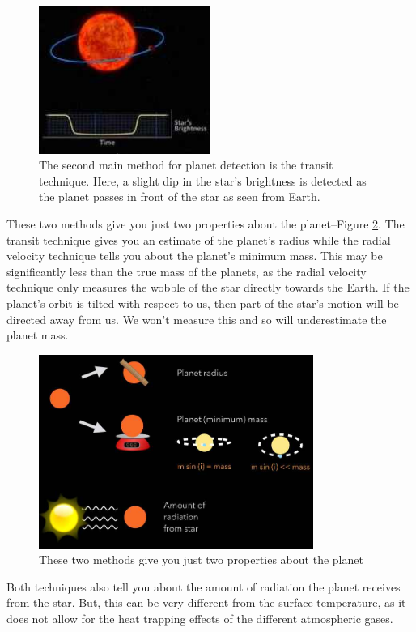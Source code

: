 \documentclass[]{article}
\begin{document}
\begin{figure}[H]
	\begin{center}
		\caption[The transit technique]{The second main method for planet detection is the transit technique. Here, a slight dip in the star's brightness is detected as the planet passes in front of the star as seen from Earth.}\label{fig:transit}
		\includegraphics[width=0.5\textwidth]{transit}
	\end{center}
\end{figure}

These two methods give you just two properties about the planet--Figure \ref{fig:planet-properties}.
The transit technique gives you an estimate of the planet's radius while the radial velocity technique tells you about the planet's minimum mass.
This may be significantly less than the true mass of the planets, as the radial velocity technique only measures the wobble of the star directly towards the Earth.
If the planet's orbit is tilted with respect to us, then part of the star's motion
will be directed away from us.
We won't measure this and so will underestimate the planet mass.

\begin{figure}[H]
	\begin{center}
		\caption{These two methods give you just two properties about the planet}\label{fig:planet-properties}
		\includegraphics[width=0.8\textwidth]{planet-properties}
	\end{center}
\end{figure}
Both techniques also tell you about the amount of radiation the planet receives from the star.
But, this can be very different from the surface temperature, as it does not allow for
the heat trapping effects of the different atmospheric gases.
\end{document}
